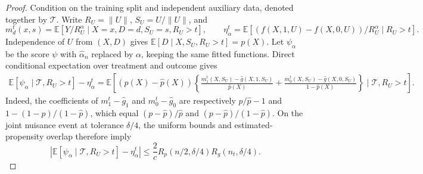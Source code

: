 \documentclass[12pt]{article}
\theoremstyle{plain}
\theoremstyle{definition}
\begin{document}
\begin{proof}
Condition on the training split and independent auxiliary data, denoted together by $\mathcal T$. Write $R_U=\|U\|$, $S_U=U/\|U\|$, and 
\[
m_d^t(x,s)=\mathbb E[Y/R_U^{\alpha}\mid X=x,D=d,S_U=s,R_U>t],\qquad \eta_\alpha^t=\mathbb E[(f(X,1,U)-f(X,0,U))/R_U^{\alpha}\mid R_U>t].
\]
 Independence of $U$ from $(X,D)$ gives $\mathbb E[D\mid X,S_U,R_U>t]=p(X)$. Let $\psi_\alpha$ be the score $\psi$ with $\hat\alpha_n$ replaced by $\alpha$, keeping the same fitted functions. Direct conditional expectation over treatment and outcome gives \begin{align*} \mathbb E[\psi_\alpha\mid\mathcal T,R_U>t]-\eta_\alpha^t=\mathbb E\left[(p(X)-\hat p(X))\left\{\frac{m_1^t(X,S_U)-\hat g(X,1,S_U)}{\hat p(X)}+\frac{m_0^t(X,S_U)-\hat g(X,0,S_U)}{1-\hat p(X)}\right\}\mid\mathcal T,R_U>t\right]. \end{align*} Indeed, the coefficients of $m_1^t-\hat g_1$ and $m_0^t-\hat g_0$ are respectively $p/\hat p-1$ and $1-(1-p)/(1-\hat p)$, which equal $(p-\hat p)/\hat p$ and $(p-\hat p)/(1-\hat p)$. On the joint nuisance event at tolerance $\delta/4$, the uniform bounds and estimated-propensity overlap therefore imply 
\[
|\mathbb E[\psi_\alpha\mid\mathcal T,R_U>t]-\eta_\alpha^t|\leq\frac2c R_p(n/2,\delta/4)R_g(n_t,\delta/4).
\]
  

\end{proof}
\end{document}

